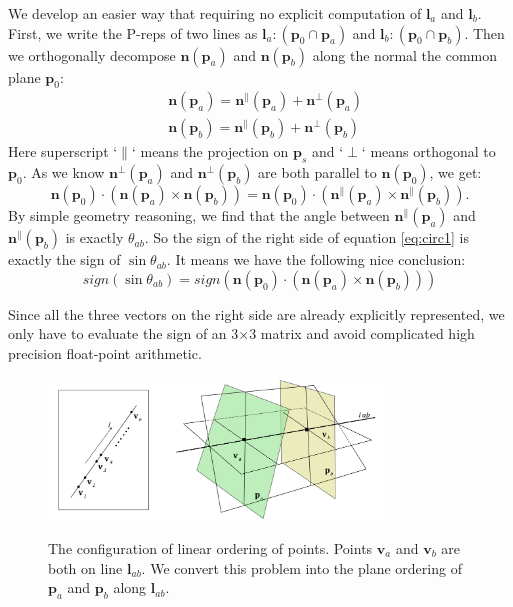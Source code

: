 \documentclass[10pt,journal,compsoc]{IEEEtran}
\begin{document}
We develop an easier way that requiring no explicit computation of $\bm{l}_a$ and $\bm{l}_b$. First, we write the P-reps of two lines as $\bm{l}_a\colon(\bm{p}_0\cap\bm{p}_a)$ and $\bm{l}_b\colon(\bm{p}_0\cap\bm{p}_b)$. Then we orthogonally decompose $\bm{n}(\bm{p}_a)$ and $\bm{n}(\bm{p}_b)$ along the normal the common plane $\bm{p}_0$:
\begin{equation}
\begin{split}
&\bm{n}(\bm{p}_a)= \bm{n}^\parallel(\bm{p}_a) + \bm{n}^\perp(\bm{p}_a)\\
&\bm{n}(\bm{p}_b)= \bm{n}^\parallel(\bm{p}_b) + \bm{n}^\perp(\bm{p}_b)
\end{split}
\end{equation}
Here superscript `$\parallel$` means the projection on $\bm{p}_s$ and `$\perp$` means orthogonal to $\bm{p}_0$. As we know $\bm{n}^\perp(\bm{p}_a)$ and $\bm{n}^\perp(\bm{p}_b)$ are both parallel to $\bm{n}(\bm{p}_0)$, we get:
\begin{equation}
\label{eq:circ1}
\bm{n}(\bm{p}_0) \cdot (\bm{n}(\bm{p}_a) \times \bm{n}(\bm{p}_b)) = \bm{n}(\bm{p}_0) \cdot (\bm{n}^\parallel(\bm{p}_a) \times \bm{n}^\parallel(\bm{p}_b)).
\end{equation}
By simple geometry reasoning, we find that the angle between $\bm{n}^\parallel(\bm{p}_a)$ and $\bm{n}^\parallel(\bm{p}_b)$ is exactly $\theta_{ab}$. So the sign of the right side of equation \ref{eq:circ1} is exactly the sign of $\sin{\theta_{ab}}$. It means we have the following nice conclusion:
\begin{equation}
\label{eq:circ2}
sign(\sin{\theta_{ab}})=  sign(\bm{n}(\bm{p}_0)\cdot(\bm{n}(\bm{p}_a) \times \bm{n}(\bm{p}_b)))
\end{equation}

Since all the three vectors on the right side are already explicitly represented, we only have to evaluate the sign of an 3$\times$3 matrix and avoid complicated high precision float-point arithmetic.
\begin{figure}
  \centering
  \includegraphics[width=3.5in]{twopointoneline}\\
  \caption{The configuration of linear ordering of points. Points $\bm{v}_a$ and $\bm{v}_b$ are both on line $\bm{l}_{ab}$. We convert this problem into the plane ordering of $\bm{p}_a$ and $\bm{p}_b$ along $\bm{l}_{ab}$.}\label{fig:twopointoneline}
\end{figure}
\end{document}
